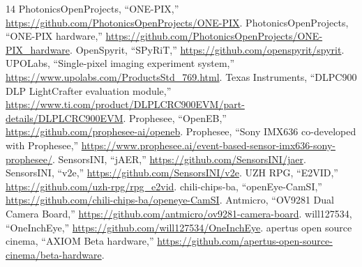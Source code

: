 \documentclass[11pt]{article}
\begin{document}
\begin{thebibliography}{14}
 PhotonicsOpenProjects, ``ONE-PIX,'' \url{https://github.com/PhotonicsOpenProjects/ONE-PIX}.
 PhotonicsOpenProjects, ``ONE-PIX hardware,'' \url{https://github.com/PhotonicsOpenProjects/ONE-PIX_hardware}.
 OpenSpyrit, ``SPyRiT,'' \url{https://github.com/openspyrit/spyrit}.
 UPOLabs, ``Single-pixel imaging experiment system,'' \url{https://www.upolabs.com/ProductsStd_769.html}.
 Texas Instruments, ``DLPC900 DLP LightCrafter evaluation module,'' \url{https://www.ti.com/product/DLPLCRC900EVM/part-details/DLPLCRC900EVM}.
 Prophesee, ``OpenEB,'' \url{https://github.com/prophesee-ai/openeb}.
 Prophesee, ``Sony IMX636 co-developed with Prophesee,'' \url{https://www.prophesee.ai/event-based-sensor-imx636-sony-prophesee/}.
 SensorsINI, ``jAER,'' \url{https://github.com/SensorsINI/jaer}.
 SensorsINI, ``v2e,'' \url{https://github.com/SensorsINI/v2e}.
 UZH RPG, ``E2VID,'' \url{https://github.com/uzh-rpg/rpg_e2vid}.
 chili-chips-ba, ``openEye-CamSI,'' \url{https://github.com/chili-chips-ba/openeye-CamSI}.
 Antmicro, ``OV9281 Dual Camera Board,'' \url{https://github.com/antmicro/ov9281-camera-board}.
 will127534, ``OneInchEye,'' \url{https://github.com/will127534/OneInchEye}.
 apertus open source cinema, ``AXIOM Beta hardware,'' \url{https://github.com/apertus-open-source-cinema/beta-hardware}.
\end{thebibliography}
\end{document}
